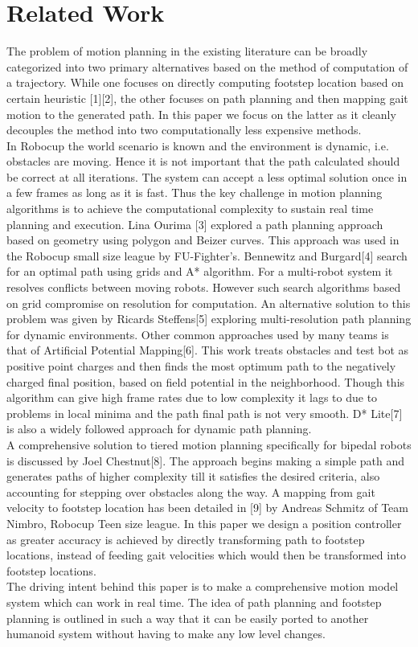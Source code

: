 \documentclass[letterpaper, 10 pt, conference]{ieeeconf}  %
\begin{document}
\section{Related Work}
The problem of motion planning in the existing literature can be broadly categorized into two primary alternatives based on the method of computation of a trajectory. While one focuses on directly computing footstep location based on certain heuristic [1][2], the other focuses on path planning and then mapping gait motion to the generated path. In this paper we focus on the latter as it cleanly decouples the method into two computationally less expensive methods.\\
In Robocup the world scenario is known and the environment is dynamic, i.e. obstacles are moving. Hence it is not important that the path calculated should be correct at all iterations. The system can accept a less optimal solution once in a few frames as long as it is fast. Thus the key challenge in motion planning algorithms is to achieve the computational complexity to sustain real time planning and execution.
Lina Ourima [3] explored a path planning approach based on geometry using polygon and Beizer curves. This approach was used in the Robocup small size league by FU-Fighter's. Bennewitz and Burgard[4] search for an optimal path using grids and A* algorithm. For a multi-robot system it resolves conflicts between moving robots. However such search algorithms based on grid compromise on resolution for computation. An alternative solution to this problem was given by Ricards Steffens[5] exploring multi-resolution path planning for dynamic environments. Other common approaches used by many teams is that of Artificial Potential Mapping[6]. This work treats obstacles and test bot as positive point charges and then finds the most optimum path to the negatively charged final position, based on field potential in the neighborhood. Though this algorithm can give high frame rates due to low complexity it lags to due to problems in local minima and the path final path is not very smooth. D* Lite[7] is also a widely followed approach for dynamic path planning.\\
A comprehensive solution to tiered motion planning specifically for bipedal robots is discussed by Joel Chestnut[8]. The approach begins making a simple path and generates paths of higher complexity till it satisfies the desired criteria, also accounting for stepping over obstacles along the way. A mapping from gait velocity to footstep location has been detailed in [9] by Andreas Schmitz of Team Nimbro, Robocup Teen size league. In this paper we design a position controller as greater accuracy is achieved by directly transforming path to footstep locations, instead of feeding gait velocities which would then be transformed into footstep locations.\\
The driving intent behind this paper is to make a comprehensive motion model system which can work in real time. The idea of path planning and footstep planning is outlined in such a way that it can be easily ported to another humanoid system without having to make any low level changes.
\end{document}
